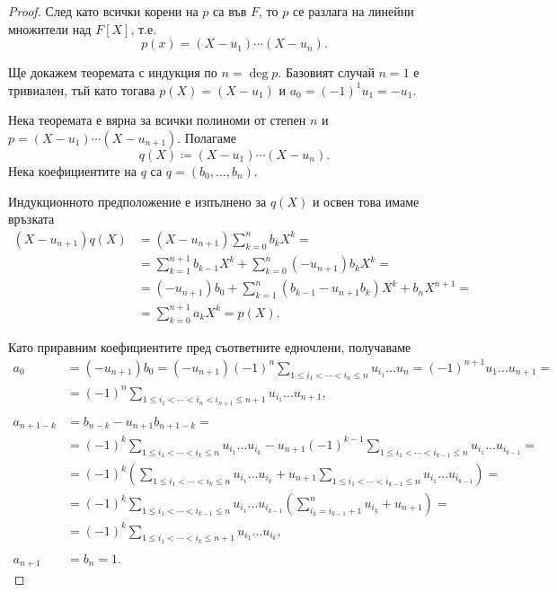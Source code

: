 \documentclass[numbers=endperiod, bibliography=totocnumbered]{scrartcl}
\begin{document}
\begin{proof}
  След като всички корени на \( p \) са във \( F \), то \( p \) се разлага на линейни множители над \( F[X] \), т.е.
  \begin{equation*}
    p(x) = (X - u_1) \cdots (X - u_n).
  \end{equation*}

  Ще докажем теоремата с индукция по \( n = \deg p \). Базовият случай \( n = 1 \) е тривиален, тъй като тогава \( p(X) = (X - u_1) \) и \( a_0 = {(-1)}^1 u_1 = -u_1 \).

  Нека теоремата е вярна за всички полиноми от степен \( n \) и \( p = (X - u_1) \cdots (X - u_{n+1}) \). Полагаме
  \begin{equation*}
    q(X) \coloneqq (X - u_1) \cdots (X - u_n).
  \end{equation*}
  Нека коефициентите на \( q \) са \( q = (b_0, \ldots, b_n) \).

  Индукционното предположение е изпълнено за \( q(X) \) и освен това имаме връзката
  \begin{align*}
    (X - u_{n+1}) q(X)
    &=
    (X - u_{n+1}) \sum_{k=0}^n b_k X^k
    = \\ &=
    \sum_{k=1}^{n+1} b_{k-1} X^k + \sum_{k=0}^n (-u_{n+1}) b_k X^k
    = \\ &=
    (-u_{n+1}) b_0 + \sum_{k=1}^n (b_{k-1} - u_{n+1} b_k) X^k + b_n X^{n+1}
    = \\ &=
    \sum_{k=0}^{n+1} a_k X^k
    =
    p(X).
  \end{align*}

  Като приравним коефициентите пред съответните едночлени, получаваме
  \begin{align*}
    a_0
    &=
    (-u_{n+1}) b_0
    =
    (-u_{n+1}) {(-1)}^n \sum_{1 \leq i_1 < \cdots < i_n \leq n} u_{i_1} \ldots u_n
    =
    {(-1)}^{n+1} u_1 \ldots u_{n+1}
    = \\ &=
    {(-1)}^n \sum_{1 \leq i_1 < \cdots < i_n < i_{n+1} \leq n + 1} u_{i_1} \ldots u_{n+1},
    \\ \\
    a_{n+1-k}
    &=
    b_{n-k} - u_{n+1} b_{n+1-k}
    = \\ &=
    {(-1)}^k \sum_{1 \leq i_1 < \cdots < i_k \leq n} u_{i_1} \ldots u_{i_k} - u_{n+1} {(-1)}^{k-1} \sum_{1 \leq i_1 < \cdots < i_{k-1} \leq n} u_{i_1} \ldots u_{i_{k-1}}
    = \\ &=
    {(-1)}^k \left( \sum_{1 \leq i_1 < \cdots < i_k \leq n} u_{i_1} \ldots u_{i_k} + u_{n+1} \sum_{1 \leq i_1 < \cdots < i_{k-1} \leq n} u_{i_1} \ldots u_{i_{k-1}} \right)
    = \\ &=
    {(-1)}^k \sum_{1 \leq i_1 < \cdots < i_{k-1} \leq n} u_{i_1} \ldots u_{i_{k-1}} \left(\sum_{i_k=i_{k-1}+1}^n u_{i_k} + u_{n+1} \right)
    = \\ &=
    {(-1)}^k \sum_{1 \leq i_1 < \cdots < i_k \leq n + 1} u_{i_1} \ldots u_{i_k},
    \\ \\
    a_{n+1} &= b_n = 1.
  \end{align*}
\end{proof}
\end{document}
